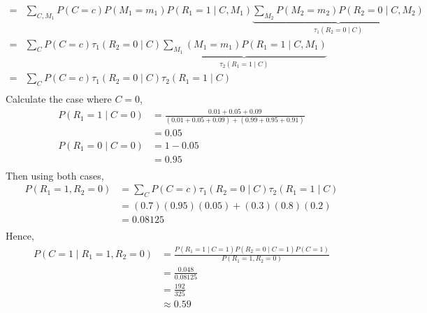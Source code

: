 \begin{enumerate}
\begin{align*}
          = & \sum_{C, M_1}P(C=c)P(M_1=m_1)P(R_1=1\mid C,M_1)\underbrace{\sum_{M_2}P(M_2=m_2)P(R_2=0\mid C, M_2)}_{\tau_1(R_2=0\mid C)} \\[5pt]
          = & \sum_{C}P(C=c)\tau_1(R_2=0\mid C)\underbrace{\sum_{M_1}(M_1=m_1)P(R_1=1\mid C,M_1)}_{\tau_2(R_1=1\mid C)}                 \\[5pt]
          = & \sum_{C}P(C=c)\tau_1(R_2=0\mid C)\tau_2(R_1=1\mid C)                                                                      \\[5pt]
        \end{align*}
        Calculate the case where $C=0$,
        \begin{align*}
          P(R_1=1 \mid C=0) & = \frac{0.01+0.05+0.09}{(0.01+0.05+0.09)+(0.99+0.95+0.91)} \\
                            & = 0.05                                                     \\
          P(R_1=0 \mid C=0) & = 1 - 0.05                                                 \\
                            & =0.95                                                      \\
        \end{align*}
        Then using both cases,
        \begin{align*}
          P(R_1=1, R_2=0) & = \sum_{C}P(C=c)\tau_1(R_2=0\mid C)\tau_2(R_1=1\mid C) \\[5pt]
                          & =(0.7)(0.95)(0.05) + (0.3)(0.8)(0.2)                   \\
                          & =0.08125                                               \\
        \end{align*}
        Hence,
        \begin{align*}
          P(C=1\mid R_1=1, R_2=0) & =\frac{P(R_1=1\mid C=1)P(R_2=0\mid C=1)P(C=1)}{P(R_1=1, R_2=0)} \\[5pt]
                                  & =\frac{0.048}{0.08125}                                          \\[5pt]
                                  & = \frac{192}{325}                                               \\[5pt]
                                  & \approx 0.59                                                    \\
        \end{align*}
\end{enumerate}

\clearpage